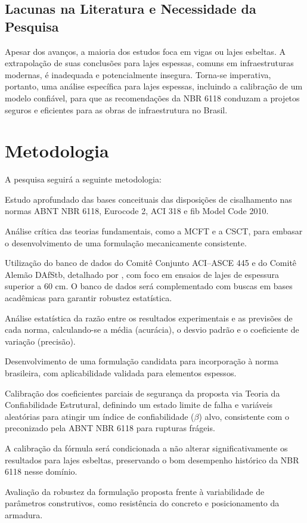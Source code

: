\documentclass[
	12pt,				%
	openright,			%
	twoside,			%
	a4paper,			%
	chapter=TITLE,		%
	section=TITLE,		%
	subsection=TITLE,	%
	subsubsection=TITLE,%
	partnum=false,
	brazil,			%
]{abntex2}
\begin{document}
\section{Lacunas na Literatura e Necessidade da Pesquisa}
Apesar dos avanços, a maioria dos estudos foca em vigas ou lajes esbeltas. A extrapolação de suas conclusões para lajes espessas, comuns em infraestruturas modernas, é inadequada e potencialmente insegura. Torna-se imperativa, portanto, uma análise específica para lajes espessas, incluindo a calibração de um modelo confiável, para que as recomendações da NBR 6118 conduzam a projetos seguros e eficientes para as obras de infraestrutura no Brasil.

\chapter{Metodologia}
A pesquisa seguirá a seguinte metodologia:
\begin{alineas}
    \item Estudo aprofundado das bases conceituais das disposições de cisalhamento nas normas ABNT NBR 6118, Eurocode 2, ACI 318 e fib Model Code 2010.
    \item Análise crítica das teorias fundamentais, como a MCFT e a CSCT, para embasar o desenvolvimento de uma formulação mecanicamente consistente.
    \item Utilização do banco de dados do Comitê Conjunto ACI–ASCE 445 e do Comitê Alemão DAfStb, detalhado por \textcite{Kuchma2019}, com foco em ensaios de lajes de espessura superior a 60 cm. O banco de dados será complementado com buscas em bases acadêmicas para garantir robustez estatística.
    \item Análise estatística da razão entre os resultados experimentais e as previsões de cada norma, calculando-se a média (acurácia), o desvio padrão e o coeficiente de variação (precisão).
    \item Desenvolvimento de uma formulação candidata para incorporação à norma brasileira, com aplicabilidade validada para elementos espessos.
    \item Calibração dos coeficientes parciais de segurança da proposta via Teoria da Confiabilidade Estrutural, definindo um estado limite de falha e variáveis aleatórias para atingir um índice de confiabilidade ($\beta$) alvo, consistente com o preconizado pela ABNT NBR 6118 para rupturas frágeis.
    \item A calibração da fórmula será condicionada a não alterar significativamente os resultados para lajes esbeltas, preservando o bom desempenho histórico da NBR 6118 nesse domínio.
    \item Avaliação da robustez da formulação proposta frente à variabilidade de parâmetros construtivos, como resistência do concreto e posicionamento da armadura.
\end{alineas}
\end{document}
